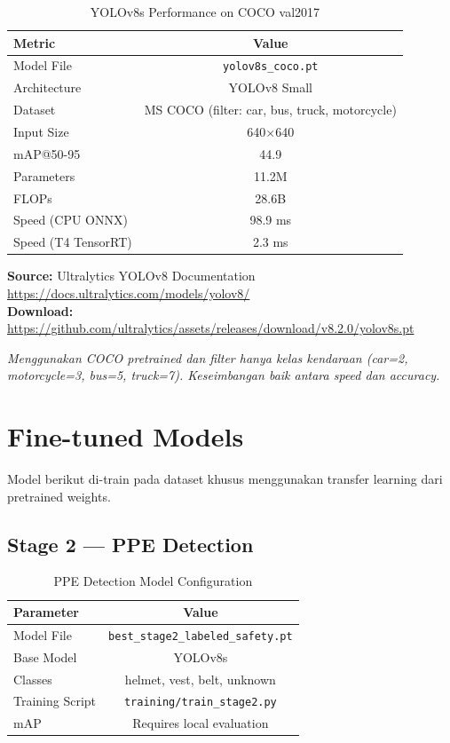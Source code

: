 \documentclass[12pt,a4paper]{article}
\begin{document}
\begin{table}[H]
\centering
\caption{YOLOv8s Performance on COCO val2017}
\begin{tabular}{@{}lc@{}}
\toprule
\textbf{Metric} & \textbf{Value} \\
\midrule
Model File & \texttt{yolov8s\_coco.pt} \\
Architecture & YOLOv8 Small \\
Dataset & MS COCO (filter: car, bus, truck, motorcycle) \\
Input Size & 640$\times$640 \\
mAP@50-95 & 44.9 \\
Parameters & 11.2M \\
FLOPs & 28.6B \\
Speed (CPU ONNX) & 98.9 ms \\
Speed (T4 TensorRT) & 2.3 ms \\
\bottomrule
\end{tabular}
\end{table}

\noindent\textbf{Source:} Ultralytics YOLOv8 Documentation\\
\url{https://docs.ultralytics.com/models/yolov8/}\\
\textbf{Download:} \url{https://github.com/ultralytics/assets/releases/download/v8.2.0/yolov8s.pt}

\vspace{1em}
\noindent\textit{Menggunakan COCO pretrained dan filter hanya kelas kendaraan (car=2, motorcycle=3, bus=5, truck=7). Keseimbangan baik antara speed dan accuracy.}

\section{Fine-tuned Models}

Model berikut di-train pada dataset khusus menggunakan transfer learning dari pretrained weights.

\subsection{Stage 2 — PPE Detection}

\begin{table}[H]
\centering
\caption{PPE Detection Model Configuration}
\begin{tabular}{@{}lc@{}}
\toprule
\textbf{Parameter} & \textbf{Value} \\
\midrule
Model File & \texttt{best\_stage2\_labeled\_safety.pt} \\
Base Model & YOLOv8s \\
Classes & helmet, vest, belt, unknown \\
Training Script & \texttt{training/train\_stage2.py} \\
mAP & Requires local evaluation \\
\bottomrule
\end{tabular}
\end{table}
\end{document}
